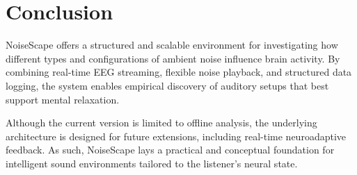 \section{Conclusion}

NoiseScape offers a structured and scalable environment for investigating how different types and configurations of ambient noise influence brain activity. By combining real-time EEG streaming, flexible noise playback, and structured data logging, the system enables empirical discovery of auditory setups that best support mental relaxation.

Although the current version is limited to offline analysis, the underlying architecture is designed for future extensions, including real-time neuroadaptive feedback. As such, NoiseScape lays a practical and conceptual foundation for intelligent sound environments tailored to the listener’s neural state.

